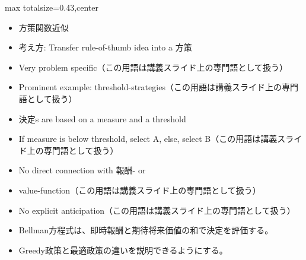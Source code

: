 \clearpage
{}
\begin{minipage}[t]{0.405\textwidth}
\begin{adjustbox}{max totalsize={\textwidth}{0.43\textheight},center}
\begin{minipage}{\textwidth}\scriptsize
{}\begin{itemize}
\item 方策関数近似
\item 考え方: Transfer rule-of-thumb idea into a 方策
\item Very problem specific（この用語は講義スライド上の専門語として扱う）
\item Prominent example: threshold-strategies（この用語は講義スライド上の専門語として扱う）
\item 決定s are based on a measure and a threshold
\item If measure is below threshold, select A, else, select B（この用語は講義スライド上の専門語として扱う）
\item No direct connection with 報酬- or
\item value-function（この用語は講義スライド上の専門語として扱う）
\item No explicit anticipation（この用語は講義スライド上の専門語として扱う）
\end{itemize}\begin{itemize}
\item Bellman方程式は、即時報酬と期待将来価値の和で決定を評価する。
\item Greedy政策と最適政策の違いを説明できるようにする。
\end{itemize}
\end{minipage}
\end{adjustbox}
\end{minipage}\hfill
